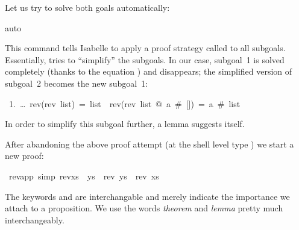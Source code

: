 \begin{isabellebody}
\begin{isamarkuptxt}
Let us try to solve both goals automatically:%
\end{isamarkuptxt}%
auto{\isacharparenright}%
\begin{isamarkuptxt}%
\noindent
This command tells Isabelle to apply a proof strategy called
 to all subgoals. Essentially,  tries to
``simplify'' the subgoals.  In our case, subgoal~1 is solved completely (thanks
to the equation ) and disappears; the simplified version
of subgoal~2 becomes the new subgoal~1:
\begin{isabelle}
~1.~\dots~rev(rev~list)~=~list~{\isasymLongrightarrow}~rev(rev~list~@~a~\#~[])~=~a~\#~list
\end{isabelle}
In order to simplify this subgoal further, a lemma suggests itself.%
\end{isamarkuptxt}%
%
%
\begin{isamarkuptext}%
After abandoning the above proof attempt (at the shell level type
) we start a new proof:%
\end{isamarkuptext}%
\ rev{\isacharunderscore}app\ {\isacharbrackleft}simp{\isacharbrackright}{\isacharcolon}\ {\isachardoublequote}rev{\isacharparenleft}xs\ {\isacharat}\ ys{\isacharparenright}\ {\isacharequal}\ {\isacharparenleft}rev\ ys{\isacharparenright}\ {\isacharat}\ {\isacharparenleft}rev\ xs{\isacharparenright}{\isachardoublequote}%
\begin{isamarkuptxt}%
\noindent The keywords  and
 are interchangable and merely indicate
the importance we attach to a proposition.  We use the words
\emph{theorem} and \emph{lemma} pretty much
interchangeably.


\end{isamarkuptxt}
\end{isabellebody}
